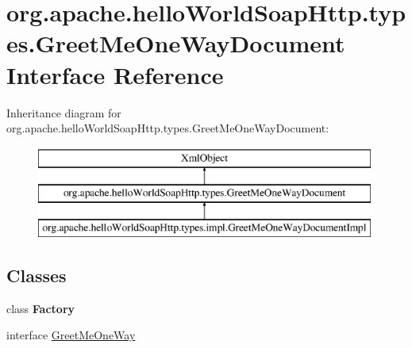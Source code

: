 \hypertarget{interfaceorg_1_1apache_1_1hello_world_soap_http_1_1types_1_1_greet_me_one_way_document}{}\section{org.\+apache.\+hello\+World\+Soap\+Http.\+types.\+Greet\+Me\+One\+Way\+Document Interface Reference}
\label{interfaceorg_1_1apache_1_1hello_world_soap_http_1_1types_1_1_greet_me_one_way_document}
Inheritance diagram for org.\+apache.\+hello\+World\+Soap\+Http.\+types.\+Greet\+Me\+One\+Way\+Document\+:\begin{figure}[H]
\begin{center}
\leavevmode
\includegraphics[height=3.000000cm]{interfaceorg_1_1apache_1_1hello_world_soap_http_1_1types_1_1_greet_me_one_way_document}
\end{center}
\end{figure}
\subsection*{Classes}
\begin{DoxyCompactItemize}
\item 
class {\bfseries Factory}
\item 
interface \hyperlink{interfaceorg_1_1apache_1_1hello_world_soap_http_1_1types_1_1_greet_me_one_way_document_1_1_greet_me_one_way}{Greet\+Me\+One\+Way}
\end{DoxyCompactItemize}
